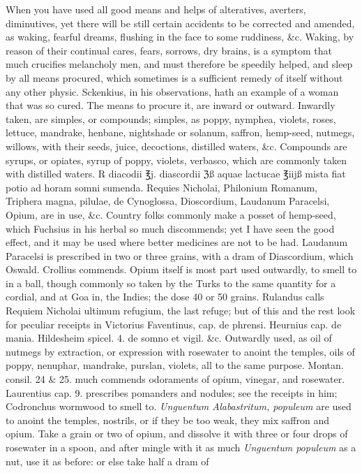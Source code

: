 When you have used all good means and helps of alteratives, averters,
diminutives, yet there will be still certain accidents to be corrected
and amended, as waking, fearful dreams, flushing in the face to some
ruddiness, \&c.
Waking, by reason of their continual cares, fears, sorrows, dry brains,
is a symptom that much crucifies melancholy men, and must therefore be
speedily helped, and sleep by all means procured, which sometimes is a
sufficient remedy of itself without any other physic. Sckenkius,
in his observations, hath an example of a woman that was so cured. The
means to procure it, are inward or outward. Inwardly taken, are
simples, or compounds; simples, as poppy, nymphea, violets, roses,
lettuce, mandrake, henbane, nightshade or solanum, saffron, hemp-seed,
nutmegs, willows, with their seeds, juice, decoctions, distilled
waters, \&c. Compounds are syrups, or opiates, syrup of poppy, violets,
verbasco, which are commonly taken with distilled waters.
℞ diacodii ℥j. diascordii ℨß aquae lactucae ℥iijß mista fiat potio ad
horam somni sumenda.
Requies Nicholai, Philonium Romanum, Triphera magna, pilulae, de
Cynoglossa, Dioscordium, Laudanum Paracelsi, Opium, are in use, \&c.
Country folks commonly make a posset of hemp-seed, which Fuchsius in
his herbal so much discommends; yet I have seen the good effect, and it
may be used where better medicines are not to be had.
Laudanum Paracelsi is prescribed in two or three grains, with a dram of
Diascordium, which Oswald. Crollius commends. Opium itself is most part
used outwardly, to smell to in a ball, though commonly so taken by the
Turks to the same quantity for a cordial, and at Goa in, the
Indies; the dose 40 or 50 grains.
Rulandus calls Requiem Nicholai ultimum refugium, the last refuge; but
of this and the rest look for peculiar receipts in Victorius
Faventinus, cap. de phrensi. Heurnius cap. de mania. Hildesheim spicel.
4. de somno et vigil. \&c. Outwardly used, as oil of nutmegs by
extraction, or expression with rosewater to anoint the temples, oils of
poppy, nenuphar, mandrake, purslan, violets, all to the same purpose.
Montan. consil. 24 \& 25. much commends odoraments of opium, vinegar,
and rosewater. Laurentius cap. 9. prescribes pomanders and nodules; see
the receipts in him; Codronchus wormwood to smell to.
\emph{Unguentum Alabastritum, populeum} are used to anoint the temples,
nostrils, or if they be too weak, they mix saffron and opium. Take a
grain or two of opium, and dissolve it with three or four drops of
rosewater in a spoon, and after mingle with it as much \emph{Unguentum
populeum} as a nut, use it as before: or else take half a dram of
